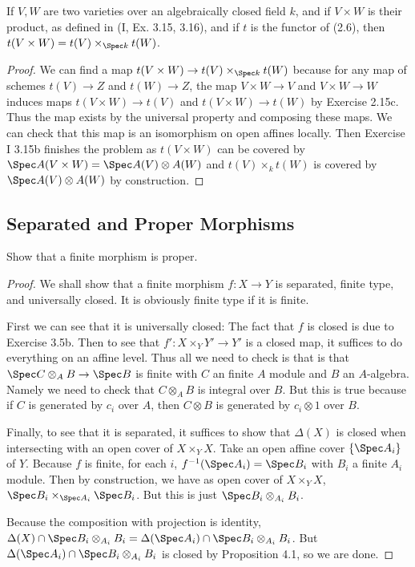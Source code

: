 \begin{exercise}
	If $V,W $ are two varieties over an algebraically closed field $k $, and if $V \times W $ is their product, as defined in (I, Ex. 3.15, 3.16), and if $t $ is the functor of (2.6), then $t(V \times W) = t(V) \times _{\Spec k} t(W) $.
\end{exercise}
\begin{proof}
	We can find a map $t(V \times W) \to t(V) \times _{\Spec k} t(W) $ because for any map of schemes $t(V) \to Z $ and $t(W) \to Z $, the map $V\times W \to V $ and $V \times W\to W $ induces maps $t(V \times W) \to t(V) $ and $t(V\times W) \to t(W) $ by Exercise 2.15c.
	Thus the map exists by the universal property and composing these maps.
	We can check that this map is an isomorphism on open affines locally.
	Then Exercise I 3.15b finishes the problem as $t(V \times W) $ can be covered by $\Spec A(V\times W) = \Spec A(V) \otimes A(W) $ and $t(V) \times _{k} t(W) $ is covered by $\Spec A(V) \otimes A(W) $ by construction.
\end{proof}

\subsection{Separated and Proper Morphisms}

\begin{exercise}
	Show that a finite morphism is proper.
\end{exercise}
\begin{proof}
	We shall show that a finite morphism $f: X\to Y $ is separated, finite type, and universally closed.
	It is obviously finite type if it is finite.

	First we can see that it is universally closed:
	The fact that $f $ is closed is due to Exercise 3.5b.
	Then to see that $f':X \times _{Y}Y' \to Y' $ is a closed map, it suffices to do everything on an affine level.
	Thus all we need to check is that is that $\Spec C \otimes_A B \to \Spec B $ is finite with $C $ an finite $A $ module and $B $ an $A $-algebra.
	Namely we need to check that $C \otimes _A B $ is integral over $B $.
	But this is true because if $C $ is generated by $c_i $ over $A $, then $C \otimes B $ is generated by $c_i \otimes 1 $ over $B $.

	Finally, to see that it is separated, it suffices to show that $\Delta(X) $ is closed when intersecting with an open cover of $X \times _Y X $.
	Take an open affine cover $\{\Spec A_i\} $ of $Y $.
	Because $f $ is finite, for each $i $, $f^{-1}(\Spec A_i) = \Spec B_i $ with $B_i $ a finite $A_i $ module.
	Then by construction, we have as open cover of $X \times _Y X $, $\Spec B_{i} \times _{\Spec A_i} \Spec B_{i} $.
	But this is just $\Spec B_{i} \otimes _{A_i} B_{i}$.

	Because the composition with projection is identity, $\Delta(X) \cap \Spec B_i \otimes_{A_i} B_i = \Delta(\Spec A_i) \cap \Spec B_i \otimes_{A_i} B_i$.
	But $\Delta(\Spec A_i) \cap \Spec B_i \otimes _{A_i} B_i $ is closed by Proposition 4.1, so we are done.
\end{proof}

